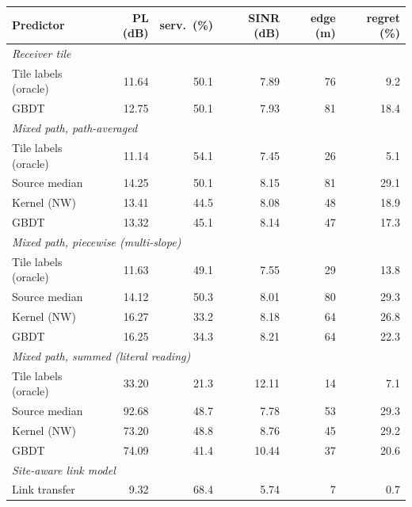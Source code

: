 \begin{tabular}{lrrrrr}
\toprule
Predictor & PL (dB) & serv.\ (\%) & SINR (dB) & edge (m) & regret (\%) \\
\midrule
\multicolumn{6}{l}{\emph{Receiver tile}} \\
Tile labels (oracle) & 11.64 & 50.1 & 7.89 & 76 & 9.2 \\
GBDT & 12.75 & 50.1 & 7.93 & 81 & 18.4 \\
\multicolumn{6}{l}{\emph{Mixed path, path-averaged}} \\
Tile labels (oracle) & 11.14 & 54.1 & 7.45 & 26 & 5.1 \\
Source median & 14.25 & 50.1 & 8.15 & 81 & 29.1 \\
Kernel (NW) & 13.41 & 44.5 & 8.08 & 48 & 18.9 \\
GBDT & 13.32 & 45.1 & 8.14 & 47 & 17.3 \\
\multicolumn{6}{l}{\emph{Mixed path, piecewise (multi-slope)}} \\
Tile labels (oracle) & 11.63 & 49.1 & 7.55 & 29 & 13.8 \\
Source median & 14.12 & 50.3 & 8.01 & 80 & 29.3 \\
Kernel (NW) & 16.27 & 33.2 & 8.18 & 64 & 26.8 \\
GBDT & 16.25 & 34.3 & 8.21 & 64 & 22.3 \\
\multicolumn{6}{l}{\emph{Mixed path, summed (literal reading)}} \\
Tile labels (oracle) & 33.20 & 21.3 & 12.11 & 14 & 7.1 \\
Source median & 92.68 & 48.7 & 7.78 & 53 & 29.3 \\
Kernel (NW) & 73.20 & 48.8 & 8.76 & 45 & 29.2 \\
GBDT & 74.09 & 41.4 & 10.44 & 37 & 20.6 \\
\multicolumn{6}{l}{\emph{Site-aware link model}} \\
Link transfer & 9.32 & 68.4 & 5.74 & 7 & 0.7 \\
\bottomrule
\end{tabular}
